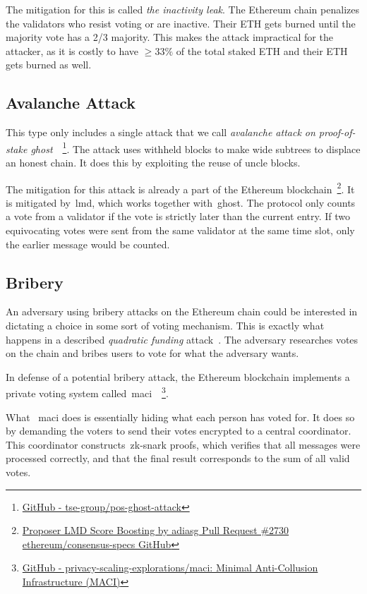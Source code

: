 The mitigation for this is called \textit{the inactivity leak}.
The Ethereum chain penalizes the validators who resist voting or are inactive.
Their ETH gets burned until the majority vote has a 2/3 majority.
This makes the attack impractical for the attacker,
as it is costly to have $\geq33\%$ of the total staked ETH and their ETH gets burned as well.

\subsection{Avalanche Attack}\label{subsec:avalanche-attack}
This type only includes a single attack that we call \textit{avalanche attack on proof-of-stake ghost}~\cite{10.1145/3560829.3563560}~\footnote{
\href{https://github.com/tse-group/pos-ghost-attack?tab=readme-ov-file}{GitHub - tse-group/pos-ghost-attack}}.
The attack uses withheld blocks to make wide subtrees to displace an honest chain.
It does this by exploiting the reuse of uncle blocks.

The mitigation for this attack is already a part of the Ethereum blockchain~\footnote{\href{https://github.com/ethereum/consensus-specs/pull/2730}{Proposer LMD Score
Boosting by adiasg Pull Request \#2730 ethereum/consensus-specs GitHub}}.
It is mitigated by~\gls{lmd}, which works together with~\gls{ghost}.
The protocol only counts a vote from a validator if the vote is strictly later than the current entry.
If two equivocating votes were sent from the same validator at the same time slot,
only the earlier message would be counted.

\subsection{Bribery}\label{subsec:bribery}
An adversary using bribery attacks on the Ethereum chain could be interested
in dictating a choice in some sort of voting mechanism.
This is exactly what happens in a described \textit{quadratic funding} attack~\cite{EthereumAttacks2024}.
The adversary researches votes on the chain and bribes users to vote for what the adversary wants.

In defense of a potential bribery attack,
the Ethereum blockchain implements a private voting system called~\gls{maci}~\cite{EthereumAttacks2024,MACI2022}~\footnote{
\href{https://github.com/privacy-scaling-explorations/maci}{GitHub -
privacy-scaling-explorations/maci: Minimal Anti-Collusion Infrastructure (MACI)}}.

What ~\gls{maci} does is essentially hiding what each person has voted for.
It does so by demanding the voters to send their votes encrypted to a central coordinator.
This coordinator constructs~\gls{zk-snark} proofs, which verifies that all messages were processed correctly,
and that the final result corresponds to the sum of all valid votes.

